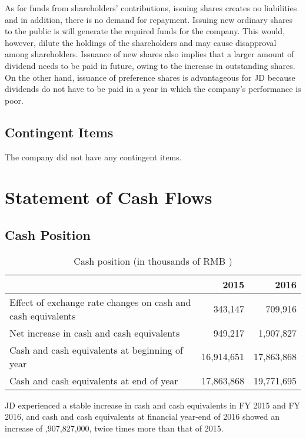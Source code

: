As for funds from shareholders’ contributions, issuing shares creates no liabilities and in addition, there is no demand for repayment. Issuing new ordinary shares to the public is will generate the required funds for the company. This would, however, dilute the holdings of the shareholders and may cause disapproval among shareholders. Issuance of new shares also implies that a larger amount of dividend needs to be paid in future, owing to the increase in outstanding shares. On the other hand, issuance of preference shares is advantageous for JD because dividends do not have to be paid in a year in which the company’s performance is poor.  

\subsection{Contingent Items}
The company did not have any contingent items.

\section{Statement of Cash Flows}
\subsection{Cash Position}
\begin{table}[H]	
	\begin{center}
		\begin{tabular}{lrr}
			\toprule
			&\textbf{2015}&\textbf{2016}\\
			\midrule
			Effect of exchange rate changes on cash and cash equivalents &	343,147&	709,916\\
			Net increase in cash and cash equivalents &949,217&	1,907,827\\
			Cash and cash equivalents at beginning of year 	&16,914,651&	17,863,868\\
			Cash and cash equivalents at end of year&	17,863,868	&19,771,695\\
			\bottomrule
		\end{tabular}
	\end{center}
	\caption{Cash position (in thousands of RMB \textyen)}\label{table:1}
\end{table}

JD experienced a stable increase in cash and cash equivalents in FY 2015 and FY 2016, and cash and cash equivalents at financial year-end of 2016 showed an increase of ,907,827,000, twice times more than that of 2015.

